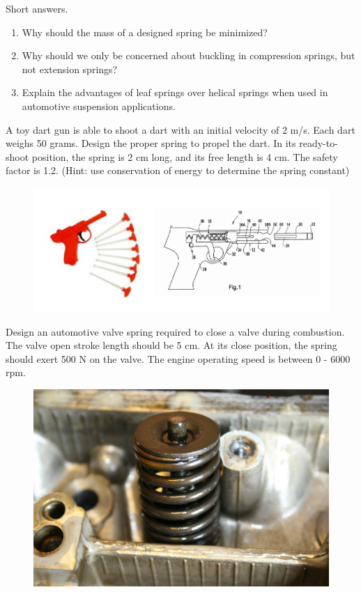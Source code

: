 \documentclass[
10pt,
a4paper,
openany,
svgnames,
]{book}
\newcommand{\exercise}{%
\item \label{lab:\arabic{chapter}-\arabic{exercisesi}}  %
}
\begin{document}
\begin{exercises}
  \exercise Short answers.
  \begin{enumerate}
  \item Why should the mass of a designed spring be minimized?
  \item Why should we only be concerned about buckling in compression springs, but not extension springs?
  \item Explain the advantages of leaf springs over helical springs when used in automotive suspension applications.
  \end{enumerate}
  
  \exercise A toy dart gun is able to shoot a dart with an initial velocity of 2 m/s. Each dart weighs 50 grams. Design the proper spring to propel the dart. In its ready-to-shoot position, the spring is 2 cm long, and its free length is 4 cm. The safety factor is 1.2. (Hint: use conservation of energy to determine the spring constant)
  \begin{figure}[H]
    \centering
    \includegraphics[scale=0.8]{pictures/Spring-design/toy-dart-gun}
  \end{figure}

  \exercise Design an automotive valve spring required to close a valve during combustion. The valve open stroke length should be 5 cm. At its close position, the spring should exert 500 N on the valve. The engine operating speed is between 0 - 6000 rpm.
  \begin{figure}[H]
    \centering
    \includegraphics[scale=0.2]{pictures/Spring-design/valve-spring}
  \end{figure}
\end{exercises}
\end{document}
